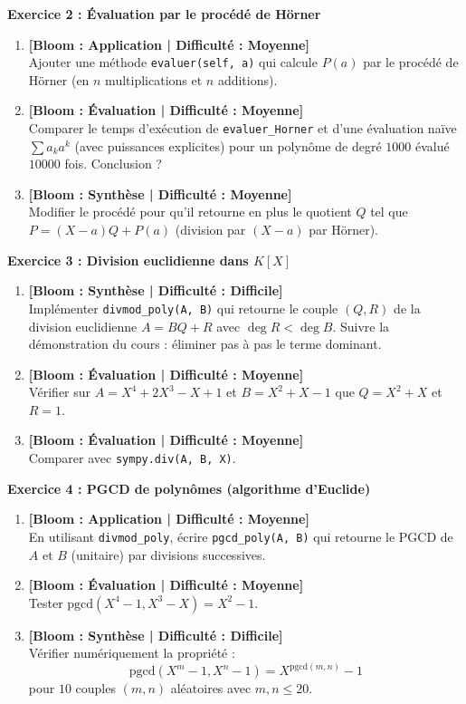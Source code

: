 \noindent\textbf{Exercice 2 : Évaluation par le procédé de Hörner}
\begin{enumerate}
    \item \textbf{[Bloom : Application | Difficulté : Moyenne]} \\
    Ajouter une méthode \texttt{evaluer(self, a)} qui calcule $P(a)$ par le procédé de Hörner (en $n$ multiplications et $n$ additions).
    \item \textbf{[Bloom : Évaluation | Difficulté : Moyenne]} \\
    Comparer le temps d'exécution de \texttt{evaluer\_Horner} et d'une évaluation naïve $\sum a_k a^k$ (avec puissances explicites) pour un polynôme de degré $1000$ évalué $10000$ fois. Conclusion ?
    \item \textbf{[Bloom : Synthèse | Difficulté : Moyenne]} \\
    Modifier le procédé pour qu'il retourne en plus le quotient $Q$ tel que $P = (X - a) Q + P(a)$ (division par $(X - a)$ par Hörner).
\end{enumerate}

\vspace{0.3cm}

\noindent\textbf{Exercice 3 : Division euclidienne dans $K[X]$}
\begin{enumerate}
    \item \textbf{[Bloom : Synthèse | Difficulté : Difficile]} \\
    Implémenter \texttt{divmod\_poly(A, B)} qui retourne le couple $(Q, R)$ de la division euclidienne $A = BQ + R$ avec $\deg R < \deg B$. Suivre la démonstration du cours : éliminer pas à pas le terme dominant.
    \item \textbf{[Bloom : Évaluation | Difficulté : Moyenne]} \\
    Vérifier sur $A = X^4 + 2X^3 - X + 1$ et $B = X^2 + X - 1$ que $Q = X^2 + X$ et $R = 1$.
    \item \textbf{[Bloom : Évaluation | Difficulté : Moyenne]} \\
    Comparer avec \texttt{sympy.div(A, B, X)}.
\end{enumerate}

\vspace{0.3cm}

\noindent\textbf{Exercice 4 : PGCD de polynômes (algorithme d'Euclide)}
\begin{enumerate}
    \item \textbf{[Bloom : Application | Difficulté : Moyenne]} \\
    En utilisant \texttt{divmod\_poly}, écrire \texttt{pgcd\_poly(A, B)} qui retourne le PGCD de $A$ et $B$ (unitaire) par divisions successives.
    \item \textbf{[Bloom : Évaluation | Difficulté : Moyenne]} \\
    Tester $\mathrm{pgcd}(X^4 - 1, X^3 - X) = X^2 - 1$.
    \item \textbf{[Bloom : Synthèse | Difficulté : Difficile]} \\
    Vérifier numériquement la propriété :
    \[ \mathrm{pgcd}(X^m - 1, X^n - 1) = X^{\mathrm{pgcd}(m, n)} - 1 \]
    pour $10$ couples $(m, n)$ aléatoires avec $m, n \le 20$.
\end{enumerate}

